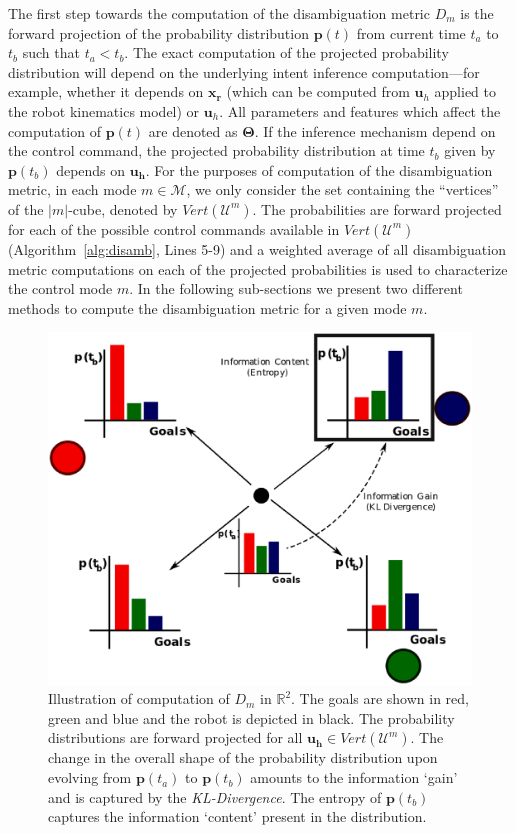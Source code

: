 \documentclass[conference]{IEEEtran}
\begin{document}
The first step towards the computation of the disambiguation metric $D_m$ is the forward projection of the probability distribution $\boldsymbol{p}(t)$ from current time $t_a$ to $t_b$ such that $t_a < t_b$. The exact computation of the projected probability distribution will depend on the underlying intent inference computation---for example, whether it depends on $\boldsymbol{x_r}$ (which can be computed from $\boldsymbol{u}_h$ applied to the robot kinematics model) or $\boldsymbol{u}_h$. All parameters and features which affect the computation of $\boldsymbol{p}(t)$ are denoted as $\boldsymbol{\Theta}$. If the inference mechanism depend on the control command, the projected probability distribution at time $t_b$ given by $\boldsymbol{p}(t_b)$ depends on $\boldsymbol{u_h}$. For the purposes of computation of the disambiguation metric, in each mode $m \in \mathcal{M}$, we only consider the set containing the ``vertices'' of the $\vert m \vert$-cube, denoted by $Vert(\mathcal{U}^m)$. The probabilities are forward projected for each of the possible control commands available in $Vert(\mathcal{U}^m)$ (Algorithm~\ref{alg:disamb}, Lines 5-9) and a weighted average of all disambiguation metric computations on each of the projected probabilities is used to characterize the control mode $m$. In the following sub-sections we present two different methods to compute the disambiguation metric for a given mode $m$. 

 \begin{figure}[h]
	\centering
	\includegraphics[width= 1.\hsize, height=0.3\vsize]{./figures/Disamb_Compute.eps}
	\vspace{-0.35cm}
	\caption{Illustration of computation of $D_m$ in $\mathbb{R}^2$. The goals are shown in red, green and blue and the robot is depicted in black. The probability distributions are forward projected for all $\boldsymbol{u_h} \in Vert(\mathcal{U}^m)$. The change in the overall shape of the probability distribution upon evolving from $\boldsymbol{p}(t_a)$ to $\boldsymbol{p}(t_b)$ amounts to the information `gain' and is captured by the \textit{KL-Divergence}. The entropy of $\boldsymbol{p}(t_b)$ captures the information `content' present in the distribution.} 
	\label{fig:disamb_compute}
\end{figure}
\end{document}
